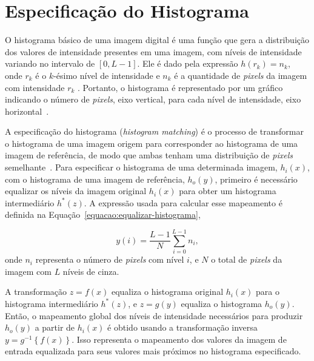 \section{Especificação do Histograma}
\label{sec:especificacao-histograma}

O histograma básico de uma imagem digital é uma função que gera a distribuição dos valores de intensidade presentes em uma imagem, com níveis de intensidade variando no intervalo de $\left[0, L - 1 \right]$. Ele é dado  pela  expressão  $h(r_{k}) = n_{k}$, onde $r_{k}$ é o  $k$-ésimo  nível de intensidade e $n_{k}$ é a quantidade de \textit{pixels} da imagem com intensidade $r_{k}$ \cite{gonzalez2008digital}. Portanto, o histograma é representado por um gráfico indicando o número de \textit{pixels}, eixo vertical, para cada nível de intensidade, eixo horizontal~\cite{pedrini2008analise}.

A especificação do histograma (\textit{histogram matching}) é o processo de transformar o histograma de uma imagem origem para corresponder ao histograma de uma imagem de referência, de modo que ambas tenham uma distribuição de \textit{pixels} semelhante~\cite{gonzalez2008digital}. Para especificar o histograma de uma determinada imagem, $h_{i}(x)$, com o histograma de uma imagem de referência, $h_{o}(y)$, primeiro é necessário equalizar os níveis da imagem original $h_{i}(x)$ para obter um histograma intermediário $h^{*}(z)$. A expressão usada para calcular esse mapeamento é definida na Equação~\ref{equacao:equalizar-histograma},

\begin{equation}
\label{equacao:equalizar-histograma}
y(i) = \frac{L - 1}{N}\sum_{i=0}^{L - 1}n_{i},
\end{equation}
onde $n_{i}$ representa o número de \textit{pixels} com nível $i$, e $N$ o total de \textit{pixels} da imagem com $L$ níveis de cinza.

A transformação $z = f(x)$ equaliza o histograma original $h_{i}(x)$ para o histograma intermediário $h^{*}(z)$, e $z = g(y)$ equaliza o histograma $h_{o}(y)$. Então, o mapeamento global dos níveis de intensidade necessários para produzir $h_{o}(y)$ a partir de $h_{i}(x)$ é obtido usando a transformação inversa $y = g^{-1}\left\{ f(x) \right\}$. Isso representa o mapeamento dos valores da imagem de entrada equalizada para seus valores mais próximos no histograma especificado. %


